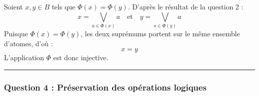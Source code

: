 \documentclass[11pt,a4paper]{article}
\begin{document}
Soient \(x, y \in B\) tels que \(\Phi(x) = \Phi(y)\). D'après le
résultat de la question 2 :
\[x = \bigvee_{a \in \Phi(x)} a \quad \text{et} \quad y = \bigvee_{a \in \Phi(y)} a\]
Puisque \(\Phi(x) = \Phi(y)\), les deux suprémums portent sur le même
ensemble d'atomes, d'où : \[x = y\] L'application \(\Phi\) est donc
injective.

\begin{center}\rule{0.5\linewidth}{0.5pt}\end{center}

\hypertarget{question-4-pruxe9servation-des-opuxe9rations-logiques}{%
\subsubsection{Question 4 : Préservation des opérations
logiques}\label{question-4-pruxe9servation-des-opuxe9rations-logiques}}
\end{document}
